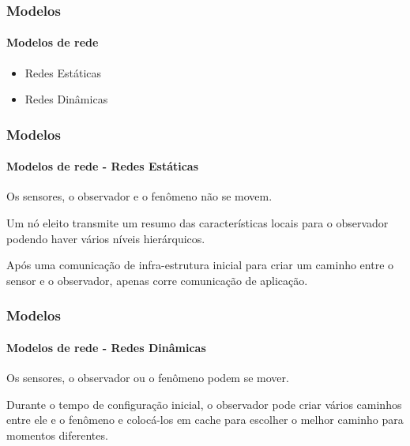 \documentclass[notes]{beamer}
\begin{document}
\begin{frame}
\frametitle{Modelos}
\framesubtitle{Modelos de rede}

\begin{block}

\begin{itemize}

\item Redes Estáticas \pause
\item Redes Dinâmicas

\end{itemize}

\end{block}

\end{frame}

\begin{frame}
\frametitle{Modelos}
\framesubtitle{Modelos de rede - Redes Estáticas}

\begin{block}

Os sensores, o observador e o fenômeno não se movem.

\end{block} \pause

\begin{block}

Um nó eleito transmite um resumo das características locais para o observador podendo haver vários níveis hierárquicos. 

\end{block} \pause

\begin{block}

Após uma comunicação de infra-estrutura inicial para criar um caminho entre o sensor e o observador, apenas corre comunicação de aplicação. 

\end{block}

\end{frame}

\begin{frame}
\frametitle{Modelos}
\framesubtitle{Modelos de rede - Redes Dinâmicas}

\begin{block}

Os sensores, o observador ou o fenômeno podem se mover.

\end{block} \pause

\begin{block}

Durante o tempo de configuração inicial, o observador pode criar vários caminhos entre ele e o fenômeno e colocá-los em cache para escolher o melhor caminho para momentos diferentes.  

\end{block}

\end{frame}
\end{document}
